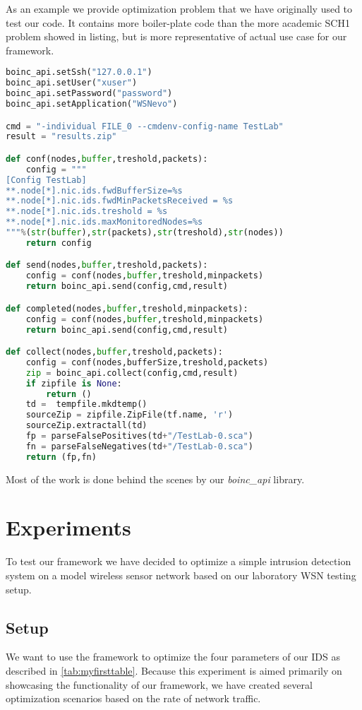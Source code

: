\documentclass[12pt,oneside]{fithesis2}
\begin{document}
As an example we provide optimization problem that we have originally used to test our code. It contains more boiler-plate code than the more academic SCH1 problem showed in listing, but is more representative of actual use case for our framework.

\begin{lstlisting}[language=Python,label=boinc_example,caption=Example usage of boinc]
boinc_api.setSsh("127.0.0.1")
boinc_api.setUser("xuser")
boinc_api.setPassword("password")
boinc_api.setApplication("WSNevo")

cmd = "-individual FILE_0 --cmdenv-config-name TestLab"
result = "results.zip"

def conf(nodes,buffer,treshold,packets):
    config = """
[Config TestLab]
**.node[*].nic.ids.fwdBufferSize=%s
**.node[*].nic.ids.fwdMinPacketsReceived = %s
**.node[*].nic.ids.treshold = %s
**.node[*].nic.ids.maxMonitoredNodes=%s
"""%(str(buffer),str(packets),str(treshold),str(nodes))
    return config

def send(nodes,buffer,treshold,packets):
    config = conf(nodes,buffer,treshold,minpackets)
    return boinc_api.send(config,cmd,result)

def completed(nodes,buffer,treshold,minpackets):
    config = conf(nodes,buffer,treshold,minpackets)
    return boinc_api.send(config,cmd,result)

def collect(nodes,buffer,treshold,packets):
    config = conf(nodes,bufferSize,treshold,packets)
    zip = boinc_api.collect(config,cmd,result)
    if zipfile is None:
        return ()
    td =  tempfile.mkdtemp()
    sourceZip = zipfile.ZipFile(tf.name, 'r')
    sourceZip.extractall(td)
    fp = parseFalsePositives(td+"/TestLab-0.sca")
    fn = parseFalseNegatives(td+"/TestLab-0.sca")
    return (fp,fn)
\end{lstlisting}

Most of the work is done behind the scenes by our \emph{boinc\_api} library.

\chapter{Experiments}
\label{chap:exp}
To test our framework we have decided to optimize a simple intrusion detection system on a model wireless sensor network based on our laboratory WSN testing setup.

\section{Setup}
We want to use the framework to optimize the four parameters of our IDS as described in \ref{tab:myfirsttable}. 
Because this experiment is aimed primarily on showcasing the functionality of our framework, we have created several optimization scenarios based on the rate of network traffic.
\end{document}
